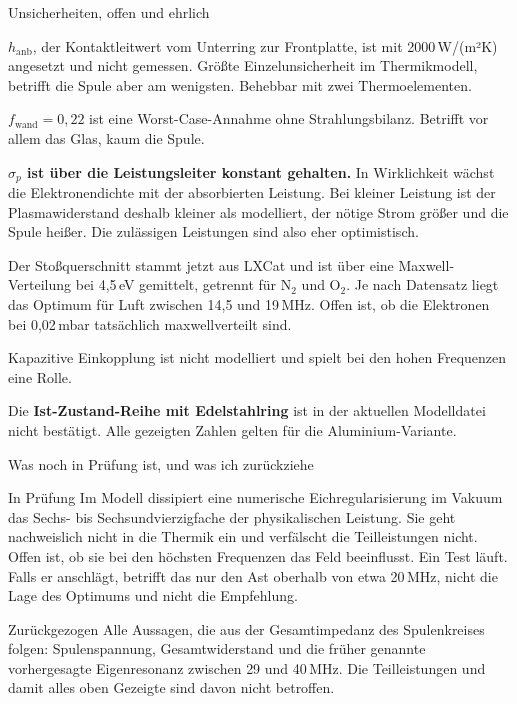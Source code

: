 \documentclass[10pt,aspectratio=169]{beamer}
\makeatletter
\let\jlu@olditemize\itemize
\let\jlu@oldenditemize\enditemize
\renewenvironment{itemize}
  {\jlu@olditemize\setlength{\itemsep}{1pt}\setlength{\parsep}{0pt}\setlength{\topsep}{2pt}}
  {\jlu@oldenditemize}
\makeatother
\begin{document}
\begin{frame}{Unsicherheiten, offen und ehrlich}
  \footnotesize
  \begin{itemize}
    \item $h_{\text{anb}}$, der Kontaktleitwert vom Unterring zur Frontplatte, ist mit 2000\,W/(m²K) angesetzt und nicht gemessen. Größte Einzelunsicherheit im Thermikmodell, betrifft die Spule aber am wenigsten. Behebbar mit zwei Thermoelementen.
    \item $f_{\text{wand}} = 0{,}22$ ist eine Worst-Case-Annahme ohne Strahlungsbilanz. Betrifft vor allem das Glas, kaum die Spule.
    \item \textbf{$\sigma_p$ ist über die Leistungsleiter konstant gehalten.} In Wirklichkeit wächst die Elektronendichte mit der absorbierten Leistung. Bei kleiner Leistung ist der Plasmawiderstand deshalb kleiner als modelliert, der nötige Strom größer und die Spule heißer. Die zulässigen Leistungen sind also eher optimistisch.
    \item Der Stoßquerschnitt stammt jetzt aus LXCat und ist über eine Maxwell-Verteilung bei 4,5\,eV gemittelt, getrennt für N$_2$ und O$_2$. Je nach Datensatz liegt das Optimum für Luft zwischen 14,5 und 19\,MHz. Offen ist, ob die Elektronen bei 0,02\,mbar tatsächlich maxwellverteilt sind.
    \item Kapazitive Einkopplung ist nicht modelliert und spielt bei den hohen Frequenzen eine Rolle.
    \item Die \textbf{Ist-Zustand-Reihe mit Edelstahlring} ist in der aktuellen Modelldatei nicht bestätigt. Alle gezeigten Zahlen gelten für die Aluminium-Variante.
  \end{itemize}
\end{frame}

\begin{frame}{Was noch in Prüfung ist, und was ich zurückziehe}
  \vfill
  \begin{block}{In Prüfung}
    \small
    Im Modell dissipiert eine numerische Eichregularisierung im Vakuum
    das Sechs- bis Sechsundvierzigfache der physikalischen Leistung. Sie
    geht nachweislich nicht in die Thermik ein und verfälscht die
    Teilleistungen nicht. Offen ist, ob sie bei den höchsten Frequenzen
    das Feld beeinflusst. Ein Test läuft. Falls er anschlägt, betrifft
    das nur den Ast oberhalb von etwa 20\,MHz, nicht die Lage des
    Optimums und nicht die Empfehlung.
  \end{block}
  \vspace{0.5em}
  \begin{alertblock}{Zurückgezogen}
    \small
    Alle Aussagen, die aus der Gesamtimpedanz des Spulenkreises folgen:
    Spulenspannung, Gesamtwiderstand und die früher genannte
    vorhergesagte Eigenresonanz zwischen 29 und 40\,MHz. Die
    Teilleistungen und damit alles oben Gezeigte sind davon nicht
    betroffen.
  \end{alertblock}
  \vfill
\end{frame}
\end{document}

